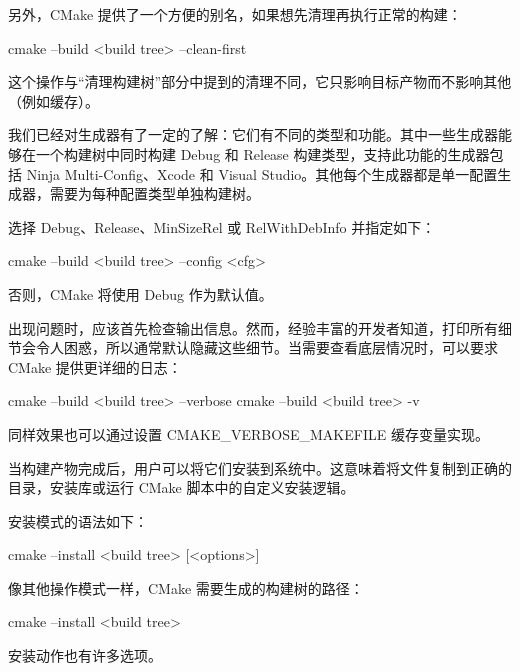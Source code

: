 另外，CMake 提供了一个方便的别名，如果想先清理再执行正常的构建：

\begin{shell}
cmake --build <build tree> --clean-first
\end{shell}

这个操作与“清理构建树”部分中提到的清理不同，它只影响目标产物而不影响其他（例如缓存）。


我们已经对生成器有了一定的了解：它们有不同的类型和功能。其中一些生成器能够在一个构建树中同时构建 Debug 和 Release 构建类型，支持此功能的生成器包括 Ninja Multi-Config、Xcode 和 Visual Studio。其他每个生成器都是单一配置生成器，需要为每种配置类型单独构建树。

选择 Debug、Release、MinSizeRel 或 RelWithDebInfo 并指定如下：

\begin{shell}
cmake --build <build tree> --config <cfg>
\end{shell}

否则，CMake 将使用 Debug 作为默认值。


出现问题时，应该首先检查输出信息。然而，经验丰富的开发者知道，打印所有细节会令人困惑，所以通常默认隐藏这些细节。当需要查看底层情况时，可以要求 CMake 提供更详细的日志：

\begin{shell}
cmake --build <build tree> --verbose
cmake --build <build tree> -v
\end{shell}

同样效果也可以通过设置 CMAKE\_VERBOSE\_MAKEFILE 缓存变量实现。


当构建产物完成后，用户可以将它们安装到系统中。这意味着将文件复制到正确的目录，安装库或运行 CMake 脚本中的自定义安装逻辑。

安装模式的语法如下：

\begin{shell}
cmake --install <build tree> [<options>]
\end{shell}

像其他操作模式一样，CMake 需要生成的构建树的路径：

\begin{shell}
cmake --install <build tree>
\end{shell}

安装动作也有许多选项。


